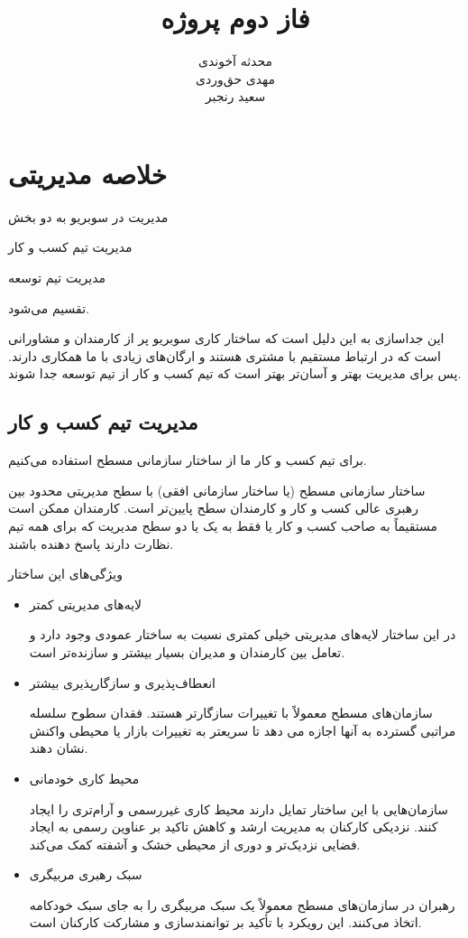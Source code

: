 \documentclass[dvipsnames, svgnames, x11names, 11pt]{article}
\title{فاز دوم پروژه}
\author{
محدثه آخوندی \\
مهدی حق‌وردی \\
سعید رنجبر
}
\date{}
\begin{document}
\maketitle
\tableofcontents
\listoffigures

\section{خلاصه مدیریتی}
مدیریت در سوبریو به دو بخش 
\begin{inparaitem}
\item 
مدیریت تیم کسب و کار
\item 
مدیریت تیم توسعه
\end{inparaitem}
تقسیم می‌شود.

این جداسازی به این دلیل است که ساختار کاری سوبریو پر از کارمندان و مشاورانی است که در ارتباط مستقیم با مشتری هستند و ارگان‌های زیادی با ما همکاری دارند. پس برای مدیریت بهتر و آسان‌تر بهتر است که تیم کسب و کار از تیم توسعه جدا شوند.

\subsection{مدیریت تیم کسب و کار}
برای تیم کسب و کار ما از ساختار سازمانی مسطح
استفاده می‌کنیم. 

ساختار سازمانی مسطح (یا ساختار سازمانی افقی) با سطح مدیریتی محدود بین رهبری عالی کسب و کار و کارمندان سطح پایین‌تر است. کارمندان ممکن است مستقیماً به صاحب کسب و کار یا فقط به یک یا دو سطح مدیریت که برای همه تیم نظارت دارند پاسخ دهنده باشند.

ویژگی‌های این ساختار

\begin{itemize}
\item 
لایه‌های مدیریتی کمتر 

در این ساختار لایه‌های مدیریتی خیلی کمتری نسبت به ساختار عمودی وجود دارد و تعامل بین کارمندان و مدیران بسیار بیشتر و سازنده‌تر است.

\item 
انعطاف‌پذیری و سازگارپذیری بیشتر

سازمان‌های مسطح معمولاً با تغییرات سازگارتر هستند. فقدان سطوح سلسله مراتبی گسترده به آنها اجازه می دهد تا سریعتر به تغییرات بازار یا محیطی واکنش نشان دهند.

\item 
محیط کاری خودمانی

سازمان‌هایی با این ساختار تمایل دارند محیط کاری غیررسمی و آرام‌تری را ایجاد کنند. نزدیکی کارکنان به مدیریت ارشد و کاهش تاکید بر عناوین رسمی به ایجاد فضایی نزدیک‌تر و دوری از محیطی خشک و آشفته کمک می‌کند.

\item 
سبک رهبری مربیگری

رهبران در سازمان‌های مسطح معمولاً یک سبک مربیگری را به جای سبک خودکامه اتخاذ می‌کنند. این رویکرد با تأکید بر توانمندسازی و مشارکت کارکنان است.
\end{itemize}
\end{document}
